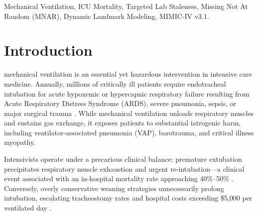 \documentclass[journal]{IEEEtran}
\begin{document}
\begin{abstract}
Our framework demonstrates that laboratory staleness operationalizes the \textit{Missing Not At Random} (MNAR) principle: clinician deferral of repeat tests serves as an objective prognostic sensor of patient stability. With sub-5ms CPU latency, our architecture provides an interpretable 24/7 background AI companion ready for bedside clinical deployment.
\end{abstract}

\begin{IEEEkeywords}
Mechanical Ventilation, ICU Mortality, Targeted Lab Staleness, Missing Not At Random (MNAR), Dynamic Landmark Modeling, MIMIC-IV v3.1.
\end{IEEEkeywords}

\section{Introduction}
 mechanical ventilation is an essential yet hazardous intervention in intensive care medicine. Annually, millions of critically ill patients require endotracheal intubation for acute hypoxemic or hypercapnic respiratory failure resulting from Acute Respiratory Distress Syndrome (ARDS), severe pneumonia, sepsis, or major surgical trauma \cite{slutsky2013, esteban2013}. While mechanical ventilation unloads respiratory muscles and sustains gas exchange, it exposes patients to substantial iatrogenic harm, including ventilator-associated pneumonia (VAP), barotrauma, and critical illness myopathy.

Intensivists operate under a precarious clinical balance: premature extubation precipitates respiratory muscle exhaustion and urgent re-intubation---a clinical event associated with an in-hospital mortality rate approaching 40\%--50\% \cite{thille2011, epstein1997}. Conversely, overly conservative weaning strategies unnecessarily prolong intubation, escalating tracheostomy rates and hospital costs exceeding \$5,000 per ventilated day \cite{dasta2005}.
\end{document}
